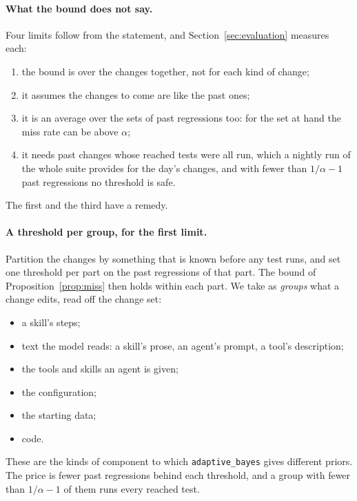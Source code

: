 \documentclass[11pt,a4paper]{article}
\newcommand{\strat}[1]{\texttt{#1}}
\begin{document}
\paragraph{What the bound does not say.} Four limits follow from the statement, and
Section~\ref{sec:evaluation} measures each:
\begin{enumerate}
  \item the bound is over the changes together, not for each kind of change;
  \item it assumes the changes to come are like the past ones;
  \item it is an average over the sets of past regressions too: for the set at hand the miss rate can be above
        $\alpha$;
  \item it needs past changes whose reached tests were all run, which a nightly run of the whole suite provides
        for the day's changes, and with fewer than $1/\alpha - 1$ past regressions no threshold is safe.
\end{enumerate}
The first and the third have a remedy.

\paragraph{A threshold per group, for the first limit.} Partition the changes by something that is known before
any test runs, and set one threshold per part on the past regressions of that part. The bound of
Proposition~\ref{prop:miss} then holds within each part. We take as \emph{groups} what a change edits, read off
the change set:
\begin{itemize}
  \item a skill's steps;
  \item text the model reads: a skill's prose, an agent's prompt, a tool's description;
  \item the tools and skills an agent is given;
  \item the configuration;
  \item the starting data;
  \item code.
\end{itemize}
These are the kinds of component to which \strat{adaptive\_bayes} gives different priors. The price is fewer past
regressions behind each threshold, and a group with fewer than $1/\alpha - 1$ of them runs every reached test.
\end{document}
